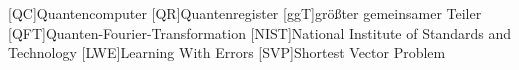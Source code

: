 \begin{acronym}
  [QC]{Quantencomputer}
  [QR]{Quantenregister}
  [ggT]{größter gemeinsamer Teiler}
  [QFT]{Quanten-Fourier-Transformation}
  [NIST]{National Institute of Standards and Technology}
  [LWE]{Learning With Errors}
  [SVP]{Shortest Vector Problem}
\end{acronym}